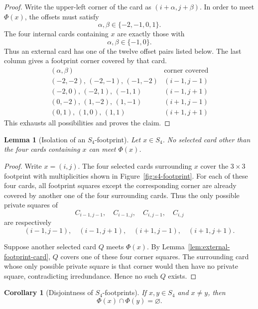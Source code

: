\documentclass[11pt]{article}
\newtheorem{lemma}[theorem]{Lemma}
\newtheorem{corollary}[theorem]{Corollary}
\begin{document}
	\begin{proof}
		Write the upper-left corner of the card as \((i+\alpha,j+\beta)\).  In order to
		meet \(\Phi(x)\), the offsets must satisfy
		\[
		\alpha,\beta\in\{-2,-1,0,1\}.
		\]
		The four internal cards containing \(x\) are exactly those with
		\[
		\alpha,\beta\in\{-1,0\}.
		\]
		Thus an external card has one of the twelve offset pairs listed below.  The
		last column gives a footprint corner covered by that card.
		\[
		\begin{array}{c|c}
			(\alpha,\beta) & \text{corner covered}\\
			\hline
			(-2,-2),\,(-2,-1),\,(-1,-2) & (i-1,j-1)\\
			(-2,0),\,(-2,1),\,(-1,1) & (i-1,j+1)\\
			(0,-2),\,(1,-2),\,(1,-1) & (i+1,j-1)\\
			(0,1),\,(1,0),\,(1,1) & (i+1,j+1)
		\end{array}
		\]
		This exhausts all possibilities and proves the claim.
	\end{proof}
	
	\begin{lemma}[Isolation of an \(S_4\)-footprint]
		\label{lem:s4-isolation}
		Let \(x\in S_4\).  No selected card other than the four cards containing \(x\)
		can meet \(\Phi(x)\).
	\end{lemma}
	
	\begin{proof}
		Write \(x=(i,j)\).  The four selected cards surrounding \(x\) cover the
		\(3\times3\) footprint with multiplicities shown in Figure~\ref{fig:s4-footprint}.
		For each of these four cards, all footprint squares except the corresponding
		corner are already covered by another one of the four surrounding cards.  Thus
		the only possible private squares of
		\[
		C_{i-1,j-1},\quad C_{i-1,j},\quad C_{i,j-1},\quad C_{i,j}
		\]
		are respectively
		\[
		(i-1,j-1),\quad (i-1,j+1),\quad (i+1,j-1),\quad (i+1,j+1).
		\]
		
		Suppose another selected card \(Q\) meets \(\Phi(x)\).  By
		Lemma~\ref{lem:external-footprint-card}, \(Q\) covers one of these four corner
		squares.  The surrounding card whose only possible private square is that
		corner would then have no private    square, contradicting irredundance.  Hence no
		such \(Q\) exists.
	\end{proof}
	
	\begin{corollary}[Disjointness of \(S_4\)-footprints]
		\label{cor:s4-footprints-disjoint}
		If \(x,y\in S_4\) and \(x\neq y\), then
		\[
		\Phi(x)\cap\Phi(y)=\varnothing.
		\]
	\end{corollary}
	
\end{document}
